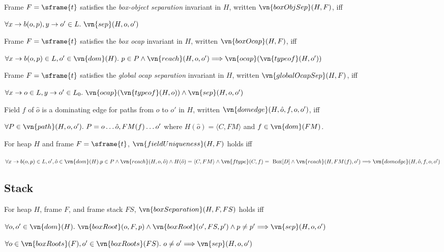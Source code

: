 \begin{definition}
    Frame $F = \sframe{t}$ satisfies the \textit{box-object separation} invariant in $H$, written $\vn{boxObjSep}(H, F)$, iff

    $\forall x \rightarrow b(o, p), y \rightarrow o' \in L.\ \vn{sep}(H, o, o')$
\end{definition}

\begin{definition}
    Frame $F = \sframe{t}$ satisfies the \textit{box ocap} invariant in $H$, written $\vn{boxOcap}(H, F)$, iff

    $\forall x \rightarrow b(o, p) \in L, o' \in \vn{dom}(H).\ p \in P \wedge \vn{reach}(H, o, o') \Longrightarrow \vn{ocap}(\vn{typeof}(H, o'))$
\end{definition}

\begin{definition}
    Frame $F = \sframe{t}$ satisfies the \textit{global ocap separation} invariant in $H$, written $\vn{globalOcapSep}(H, F)$, iff

    $\forall x \rightarrow o \in L, y \rightarrow o' \in L_0.\ \vn{ocap}(\vn{typeof}(H, o)) \wedge \vn{sep}(H, o, o')$
\end{definition}

\begin{definition}
    Field $f$ of $\hat{o}$ is a dominating edge for paths from $o$ to $o'$ in $H$, written $\vn{domedge}(H, \hat{o}, f, o, o')$, iff

    $\forall P \in \vn{path}(H, o, o').\ P = o \dots \hat{o}, FM(f) \dots o'$ where $H(\hat{o}) = \langle C, FM \rangle$ and $f \in \vn{dom}(FM)$.
\end{definition}

\begin{definition}
   For heap $H$ and frame $F = \sframe{t}$, $\vn{fieldUniqueness}(H, F)$ holds iff
   
   $\forall x \rightarrow b(o, p) \in L, o', \hat{o} \in \vn{dom}(H).\\
   p \in P \wedge \vn{reach}(H, o, \hat{o}) \wedge H(\hat{o}) = \langle C, FM \rangle \wedge \vn{ftype}(C, f) = \text{ Box}[D] \wedge \vn{reach}(H, FM(f), o') \Longrightarrow \vn{domedge}(H, \hat{o}, f, o, o')$
\end{definition}


\subsection{Stack}
\begin{definition}
    For heap $H$, frame $F$, and frame stack $FS$, $\vn{boxSeparation}(H, F, FS)$ holds iff
    
    $\forall o, o' \in \vn{dom}(H).\ \vn{boxRoot}(o, F, p) \wedge \vn{boxRoot}(o', FS, p') \wedge p \neq p' \Longrightarrow \vn{sep}(H, o, o')$
    
    $\forall o \in \vn{boxRoots}(F), o' \in \vn{boxRoots}(FS).\ o \neq o' \Longrightarrow \vn{sep}(H, o, o')$
\end{definition}

